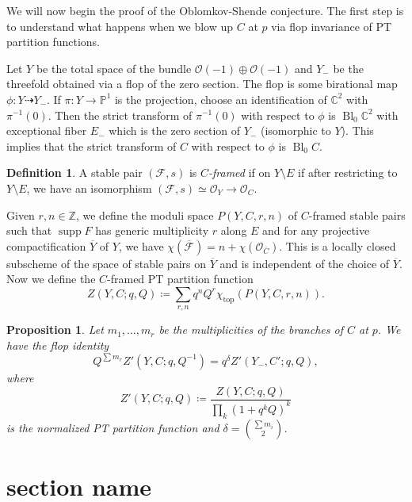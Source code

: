 \documentclass{amsart}
\newtheorem{prop}[thm]{Proposition}
\theoremstyle{definition}
\newtheorem{defn}[thm]{Definition}
\theoremstyle{remark}
\theoremstyle{plain}
\theoremstyle{definition}
\theoremstyle{remark}
\newcommand{\C}{\mathbb{C}}
\newcommand{\Z}{\mathbb{Z}}
\renewcommand{\P}{\mathbb{P}}
\newcommand{\mc}[1]{\mathcal{#1}}
\newcommand{\mr}[1]{\mathrm{#1}}
\newcommand{\ol}[1]{\overline{#1}}
\newcommand{\1}{\mathbf{1}}
\newcommand{\2}{\mathbf{2}}
\newcommand{\3}{\mathbf{3}}
\DeclareMathOperator{\supp}{supp}
\DeclareMathOperator{\Bl}{Bl}
\begin{document}
We will now begin the proof of the Oblomkov-Shende conjecture. The first step is to understand what happens when we blow up $C$ at $p$ via flop invariance of PT partition functions.

Let $Y$ be the total space of the bundle $\mc{O}(-1) \oplus \mc{O}(-1)$ and $Y_-$ be the threefold obtained via a flop of the zero section. The flop is some birational map $\phi \colon Y \dashrightarrow Y_-$. If $\pi \colon Y \to \P^1$ is the projection, choose an identification of $\C^2$ with $\pi^{-1}(0)$. Then the strict transform of $\pi^{-1}(0)$ with respect to $\phi$ is $\Bl_{0} \C^2$ with exceptional fiber $E_-$ which is the zero section of $Y_-$ (isomorphic to $Y$). This implies that the strict transform of $C$ with respect to $\phi$ is $\Bl_0 C$.

\begin{defn}
    A stable pair $(\mc{F}, s)$ is \textit{$C$-framed} if on $Y \setminus E$ if after restricting to $Y \setminus E$, we have an isomorphism $(\mc{F}, s) \simeq \mc{O}_Y \to \mc{O}_C$.
\end{defn}

Given $r, n \in \Z$, we define the moduli space $P(Y, C, r, n)$ of $C$-framed stable pairs such that $\supp F$ has generic multiplicity $r$ along $E$ and for any projective compactification $\ol{Y}$ of $Y$, we have $\chi(\ol{\mc{F}}) = n + \chi(\mc{O}_{\ol{C}})$. This is a locally closed subscheme of the space of stable pairs on $\ol{Y}$ and is independent of the choice of $\ol{Y}$. Now we define the $C$-framed PT partition function
\[ Z(Y, C; q, Q) \coloneqq \sum_{r,n} q^n Q^r \chi_{\mr{top}}(P(Y,C,r,n)). \]

\begin{prop}
    Let $m_1, \ldots, m_r$ be the multiplicities of the branches of $C$ at $p$. We have the flop identity
    \[Q^{\sum m_r} Z'(Y, C; q, Q^{-1}) = q^{\delta} Z'(Y_-, C'; q,Q), \]
    where 
    \[ Z'(Y,C; q,Q) \coloneqq \frac{Z(Y,C; q,Q)}{\prod_k {(1+q^k Q)}^k} \]
    is the normalized PT partition function and $\delta = \binom{\sum m_i}{2}$.
\end{prop}

\section{section name}%
\label{sec:section_name}
\end{document}
